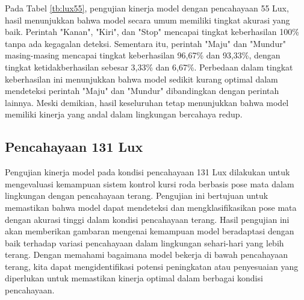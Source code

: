 Pada Tabel \ref{tb:lux55}, pengujian kinerja model dengan pencahayaan 55 Lux, hasil menunjukkan bahwa model secara umum memiliki tingkat akurasi yang baik. Perintah "Kanan", "Kiri", dan "Stop" mencapai tingkat keberhasilan 100\% tanpa ada kegagalan deteksi. Sementara itu, perintah "Maju" dan "Mundur" masing-masing mencapai tingkat keberhasilan 96,67\% dan 93,33\%, dengan tingkat ketidakberhasilan sebesar 3,33\% dan 6,67\%. Perbedaan dalam tingkat keberhasilan ini menunjukkan bahwa model sedikit kurang optimal dalam mendeteksi perintah "Maju" dan "Mundur" dibandingkan dengan perintah lainnya. Meski demikian, hasil keseluruhan tetap menunjukkan bahwa model memiliki kinerja yang andal dalam lingkungan bercahaya redup.

\subsection{Pencahayaan 131 Lux}

Pengujian kinerja model pada kondisi pencahayaan 131 Lux dilakukan untuk mengevaluasi kemampuan sistem kontrol kursi roda berbasis pose mata dalam lingkungan dengan pencahayaan terang. Pengujian ini bertujuan untuk memastikan bahwa model dapat mendeteksi dan mengklasifikasikan pose mata dengan akurasi tinggi dalam kondisi pencahayaan terang. Hasil pengujian ini akan memberikan gambaran mengenai kemampuan model beradaptasi dengan baik terhadap variasi pencahayaan dalam lingkungan sehari-hari yang lebih terang. Dengan memahami bagaimana model bekerja di bawah pencahayaan terang, kita dapat mengidentifikasi potensi peningkatan atau penyesuaian yang diperlukan untuk memastikan kinerja optimal dalam berbagai kondisi pencahayaan.

